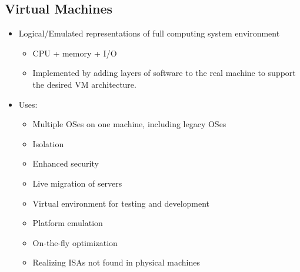 \documentclass[12pt]{article}
\begin{document}
\subsection{Virtual Machines}
\begin{itemize}
    \item Logical/Emulated representations of full computing system environment \begin{itemize}
        \item CPU + memory + I/O
        \item Implemented by adding layers of software to the real machine to support the desired VM architecture.
    \end{itemize}
    \item Uses: \begin{itemize}
        \item Multiple OSes on one machine, including legacy OSes
        \item Isolation
        \item Enhanced security
        \item Live migration of servers
        \item Virtual environment for testing and development
        \item Platform emulation
        \item On-the-fly optimization
        \item Realizing ISAs not found in physical machines
    \end{itemize}
\end{itemize}
\end{document}
